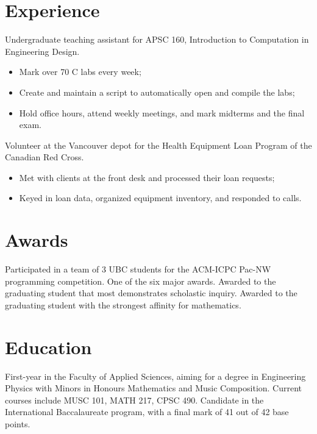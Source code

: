 \documentclass{cvx}
\begin{document}

\section{Experience}
Undergraduate teaching assistant for APSC 160, Introduction to Computation in Engineering Design.
\begin{itemize}
  \setlength \itemsep{0em}
  \item Mark over 70 C labs every week;
  \item Create and maintain a script to automatically open and compile the labs;
  \item Hold office hours, attend weekly meetings, and mark midterms and the final exam.
\end{itemize}

Volunteer at the Vancouver depot for the Health Equipment Loan Program of the Canadian Red Cross.
\begin{itemize}
  \setlength \itemsep{0em}
  \item Met with clients at the front desk and processed their loan requests;
  \item Keyed in loan data, organized equipment inventory, and responded to calls.
\end{itemize}


\section{Awards}
Participated in a team of 3 UBC students for the ACM-ICPC Pac-NW programming competition.
\vspace{10pt}
One of the six major awards. Awarded to the graduating student that most demonstrates scholastic inquiry.
Awarded to the graduating student with the strongest affinity for mathematics.


\section{Education}
First-year in the Faculty of Applied Sciences, aiming for a degree in Engineering Physics with Minors in Honours Mathematics and Music Composition. Current courses include MUSC 101, MATH 217, CPSC 490.
Candidate in the International Baccalaureate program, with a final mark of 41 out of 42 base points.
\end{document}
